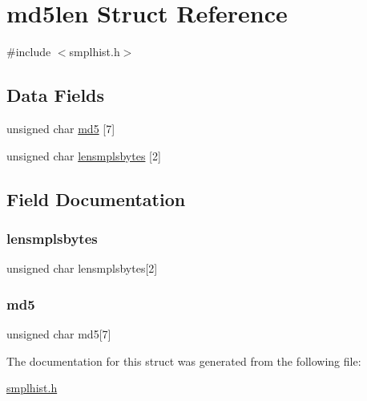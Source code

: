 \hypertarget{structmd5len}{}\section{md5len Struct Reference}
\label{structmd5len}


{\ttfamily \#include $<$smplhist.\+h$>$}

\subsection*{Data Fields}
\begin{DoxyCompactItemize}
\item 
unsigned char \mbox{\hyperlink{structmd5len_a4c66fedccd3b4737bd953f53dccc3c8a}{md5}} \mbox{[}7\mbox{]}
\item 
unsigned char \mbox{\hyperlink{structmd5len_a0f1659d851e4200abf60643049dd9e9a}{lensmplsbytes}} \mbox{[}2\mbox{]}
\end{DoxyCompactItemize}


\subsection{Field Documentation}
\mbox{\label{structmd5len_a0f1659d851e4200abf60643049dd9e9a}} 
\subsubsection{\texorpdfstring{lensmplsbytes}{lensmplsbytes}}
{\footnotesize\ttfamily unsigned char lensmplsbytes\mbox{[}2\mbox{]}}

\mbox{\label{structmd5len_a4c66fedccd3b4737bd953f53dccc3c8a}} 
\subsubsection{\texorpdfstring{md5}{md5}}
{\footnotesize\ttfamily unsigned char md5\mbox{[}7\mbox{]}}



The documentation for this struct was generated from the following file\+:\begin{DoxyCompactItemize}
\item 
\mbox{\hyperlink{smplhist_8h}{smplhist.\+h}}\end{DoxyCompactItemize}

